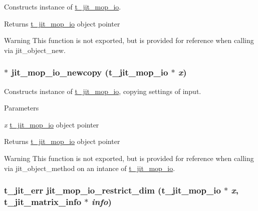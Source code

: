 Constructs instance of \hyperlink{structt__jit__mop__io}{t\_\-jit\_\-mop\_\-io}. \begin{DoxyReturn}{Returns}
\hyperlink{structt__jit__mop__io}{t\_\-jit\_\-mop\_\-io} object pointer
\end{DoxyReturn}
\begin{DoxyWarning}{Warning}
This function is not exported, but is provided for reference when calling via jit\_\-object\_\-new. 
\end{DoxyWarning}
\hypertarget{group__mopmod_gabf7dab18444e7085ad858753e51a467c}{
\subsubsection[{jit\_\-mop\_\-io\_\-newcopy}]{ $\ast$ jit\_\-mop\_\-io\_\-newcopy ({\bf t\_\-jit\_\-mop\_\-io} $\ast$ {\em x})}}
\label{group__mopmod_gabf7dab18444e7085ad858753e51a467c}


Constructs instance of \hyperlink{structt__jit__mop__io}{t\_\-jit\_\-mop\_\-io}, copying settings of input. 
\begin{DoxyParams}{Parameters}
\item[{\em x}]\hyperlink{structt__jit__mop__io}{t\_\-jit\_\-mop\_\-io} object pointer \end{DoxyParams}
\begin{DoxyReturn}{Returns}
\hyperlink{structt__jit__mop__io}{t\_\-jit\_\-mop\_\-io} object pointer
\end{DoxyReturn}
\begin{DoxyWarning}{Warning}
This function is not exported, but is provided for reference when calling via jit\_\-object\_\-method on an intance of \hyperlink{structt__jit__mop__io}{t\_\-jit\_\-mop\_\-io}. 
\end{DoxyWarning}
\hypertarget{group__mopmod_ga8d5cb38974f12f1f7a140eadf36afacc}{
\subsubsection[{jit\_\-mop\_\-io\_\-restrict\_\-dim}]{\setlength{\rightskip}{0pt plus 5cm}t\_\-jit\_\-err jit\_\-mop\_\-io\_\-restrict\_\-dim ({\bf t\_\-jit\_\-mop\_\-io} $\ast$ {\em x}, \/  {\bf t\_\-jit\_\-matrix\_\-info} $\ast$ {\em info})}}
\label{group__mopmod_ga8d5cb38974f12f1f7a140eadf36afacc}


